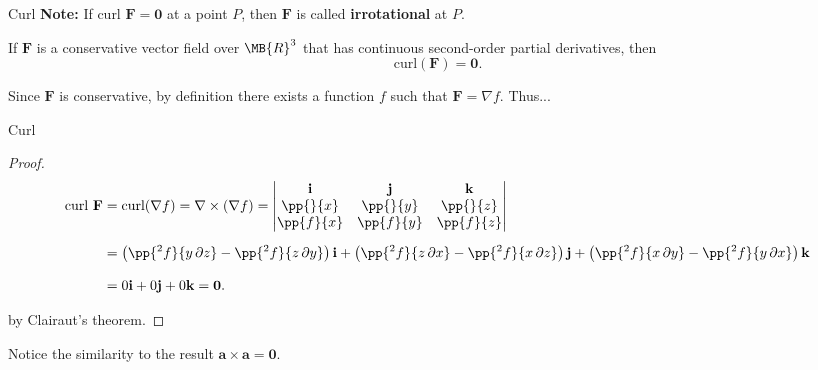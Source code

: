 \documentclass[11pt,english,
handout
]{beamer}
\begin{document}
\begin{frame}[t]{Curl}
\small
\textbf{Note:} If curl $\mathbf{F}=\mathbf{0}$ at a point $P$, then $\mathbf{F}$ is called \textbf{irrotational} at $P$.\pause

\lspace
\begin{theorem}
If $\mathbf{F}$ is a conservative vector field over $\MB{R}^3$ that has continuous second-order partial derivatives, then
\[
\text{curl}(\mathbf{F})=\mathbf{0}.
\]
\end{theorem}\pause

\lspace
\begin{proofs}

Since $\mathbf{F}$ is conservative, by definition there exists a function $f$ such that $\mathbf{F}=\nabla f$. Thus...
\end{proofs}
\end{frame}













\begin{frame}[t]{Curl}
\small
\begin{proof}
\begin{align*}
\text{curl }\mathbf{F}&=\text{curl}(\nabla f)=\nabla \times (\nabla f)=\begin{vmatrix}\mathbf{i} & \mathbf{j} & \mathbf{k}\\\pp{}{x} & \pp{}{y} & \pp{}{z}\\ \pp{f}{x} & \pp{f}{y} & \pp{f}{z}\end{vmatrix}\\[2mm]
&=\left(\pp{^2f}{y\,\partial z}-\pp{^2f}{z\,\partial y}\right)\mathbf{i}+\left(\pp{^2f}{z\,\partial x}-\pp{^2f}{x\,\partial z}\right)\mathbf{j}+\left(\pp{^2f}{x\,\partial y}-\pp{^2f}{y\,\partial x}\right)\mathbf{k}\\[3mm]
&=0\mathbf{i}+0\mathbf{j}+0\mathbf{k}=\mathbf{0}.
\end{align*}

by Clairaut's theorem.
\end{proof}\pause

\lspace
Notice the similarity to the result $\mathbf{a}\times \mathbf{a}=\mathbf{0}$.
\end{frame}
\end{document}
